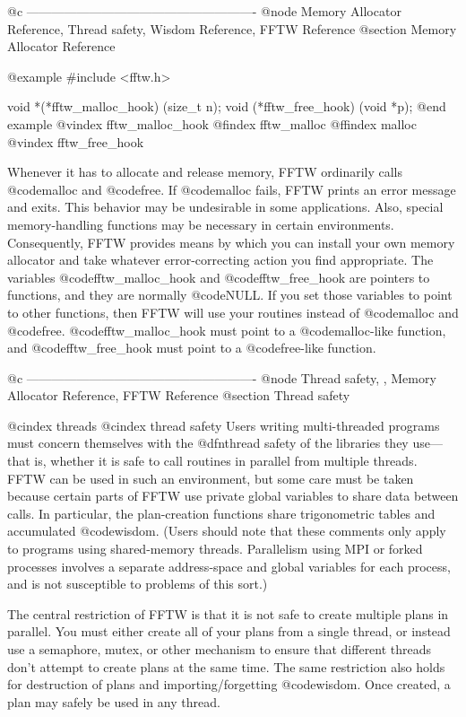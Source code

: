 @c -------------------------------------------------------
@node    Memory Allocator Reference, Thread safety, Wisdom Reference, FFTW Reference
@section Memory Allocator Reference 

@example
#include <fftw.h>

void *(*fftw_malloc_hook) (size_t n);
void (*fftw_free_hook) (void *p);
@end example
@vindex fftw_malloc_hook
@findex fftw_malloc
@ffindex malloc
@vindex fftw_free_hook

Whenever it has to allocate and release memory, FFTW ordinarily calls
@code{malloc} and @code{free}.  
If @code{malloc} fails, FFTW prints an error message and exits.  This
behavior may be undesirable in some applications. Also, special
memory-handling functions may be necessary in certain
environments. Consequently, FFTW provides means by which you can install
your own memory allocator and take whatever error-correcting action you
find appropriate.  The variables @code{fftw_malloc_hook} and
@code{fftw_free_hook} are pointers to functions, and they are normally
@code{NULL}.  If you set those variables to point to other functions,
then FFTW will use your routines instead of @code{malloc} and
@code{free}.  @code{fftw_malloc_hook} must point to a @code{malloc}-like
function, and @code{fftw_free_hook} must point to a @code{free}-like
function.

@c -------------------------------------------------------
@node Thread safety,  , Memory Allocator Reference, FFTW Reference
@section Thread safety

@cindex threads
@cindex thread safety
Users writing multi-threaded programs must concern themselves with the
@dfn{thread safety} of the libraries they use---that is, whether it is
safe to call routines in parallel from multiple threads.  FFTW can be
used in such an environment, but some care must be taken because certain
parts of FFTW use private global variables to share data between calls.
In particular, the plan-creation functions share trigonometric tables
and accumulated @code{wisdom}.  (Users should note that these comments
only apply to programs using shared-memory threads.  Parallelism using
MPI or forked processes involves a separate address-space and global
variables for each process, and is not susceptible to problems of this
sort.)

The central restriction of FFTW is that it is not safe to create
multiple plans in parallel.  You must either create all of your plans
from a single thread, or instead use a semaphore, mutex, or other
mechanism to ensure that different threads don't attempt to create plans
at the same time.  The same restriction also holds for destruction of
plans and importing/forgetting @code{wisdom}.  Once created, a plan may
safely be used in any thread.

